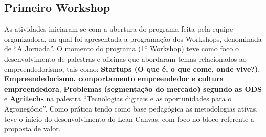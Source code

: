 \subsection{Primeiro Workshop}

As atividades iniciaram-se com a abertura do programa feita pela equipe organizadora, na qual foi apresentada a programação dos Workshops, denominada de “A Jornada”. O momento do programa (1º Workshop) teve como foco o desenvolvimento de palestras e oficinas que abordaram temas relacionados ao empreendedorismo, tais como: \textbf{Startups (O que é, o que come, onde vive?)}, \textbf{Empreendedorismo, comportamento empreendedor e cultura empreendedora},  \textbf{Problemas (segmentação do mercado) segundo as ODS} e \textbf{Agritechs} na palestra “Tecnologias digitais e as oportunidades para o Agronegócio”. Como prática tendo como base pedagógica as metodologias ativas,  teve o início do desenvolvimento do Lean Canvas, com foco no bloco referente a proposta de valor.

